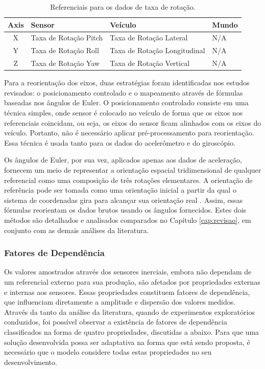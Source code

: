 \begin{table}[h!]
    \caption{Referenciais para os dados de taxa de rotação.}
    \label{table:gyroscope_reference_frames}
    \centering
    \small
    \begin{tabular}{clll}
        \toprule
        \textbf{Axis} & \textbf{Sensor} & \textbf{Veículo} & \textbf{Mundo} \\
        \toprule
        X & Taxa de Rotação Pitch & Taxa de Rotação Lateral & N/A \\
        \midrule
        Y & Taxa de Rotação Roll & Taxa de Rotação Longitudinal & N/A \\
        \midrule
        Z & Taxa de Rotação Yaw & Taxa de Rotação Vertical & N/A \\
        \bottomrule
    \end{tabular}
\end{table}

Para a reorientação dos eixos, duas estratégias foram identificadas nos estudos revisados: o posicionamento controlado e o mapeamento através de fórmulas baseadas nos ângulos de Euler. O posicionamento controlado consiste em uma técnica simples, onde sensor é colocado no veículo de forma que os eixos nos referenciais coincidam, ou seja, os eixos do sensor ficam alinhados com os eixos do veículo. Portanto, não é necessário aplicar pré-processamento para reorientação. Essa técnica é usada tanto para os dados do acelerômetro e do giroscópio. 

Os ângulos de Euler, por sua vez, aplicados apenas aos dados de aceleração, fornecem um meio de representar a orientação espacial tridimensional de qualquer referencial como uma composição de três rotações elementares. A orientação de referência pode ser tomada como uma orientação inicial a partir da qual o sistema de coordenadas gira para alcançar sua orientação real \cite{Singh2017}. Assim, essas fórmulas reorientam os dados brutos usando os ângulos fornecidos. Estes dois métodos são detalhados e analisados comparados no Capítulo \ref{cap:revisao}, em conjunto com as demais análises da literatura. 

\subsubsection{Fatores de Dependência}

Os valores amostrados através dos sensores inerciais, embora não dependam de um referencial externo para sua produção, são afetados por propriedades externas e internas aos sensores. Essas propriedades constituem fatores de dependência, que influenciam diretamente a amplitude e dispersão dos valores medidos. Através da tanto da análise da literatura, quando de experimentos exploratórios conduzidos, foi possível observar a existência de fatores de dependência classificados na forma de quatro propriedades, discutidas a abaixo. Para que uma solução desenvolvida possa ser adaptativa na forma que está sendo proposta, é necessário que o modelo considere todas estas propriedades no seu desenvolvimento.

